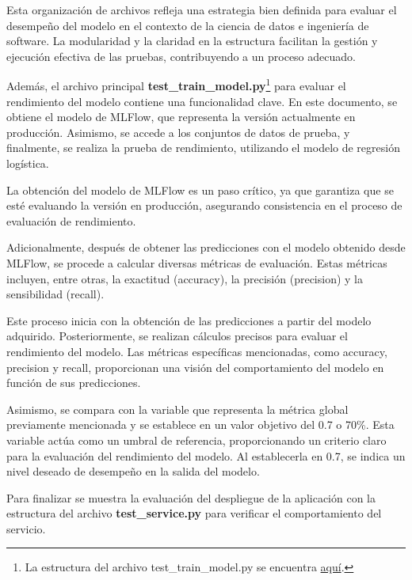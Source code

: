\newpage

Esta organización de archivos refleja una estrategia bien definida para evaluar el desempeño del modelo en el contexto de la ciencia de datos e ingeniería de software. La modularidad y la claridad en la estructura facilitan la gestión y ejecución efectiva de las pruebas, contribuyendo a un proceso adecuado.

Además, el archivo principal \textbf{test\_train\_model.py}\footnote{La estructura del archivo test\_train\_model.py se encuentra \href{https://github.com/juferoto/mlops_project/blob/master/training/tests/test_train_model.py}{aquí}.} para evaluar el rendimiento del modelo contiene una funcionalidad clave. En este documento, se obtiene el modelo de MLFlow, que representa la versión actualmente en producción. Asimismo, se accede a los conjuntos de datos de prueba, y finalmente, se realiza la prueba de rendimiento, utilizando el modelo de regresión logística.

La obtención del modelo de MLFlow es un paso crítico, ya que garantiza que se esté evaluando la versión en producción, asegurando consistencia en el proceso de evaluación de rendimiento.

Adicionalmente, después de obtener las predicciones con el modelo obtenido desde MLFlow, se procede a calcular diversas métricas de evaluación. Estas métricas incluyen, entre otras, la exactitud (accuracy), la precisión (precision) y la sensibilidad (recall).

Este proceso inicia con la obtención de las predicciones a partir del modelo adquirido. Posteriormente, se realizan cálculos precisos para evaluar el rendimiento del modelo. Las métricas específicas mencionadas, como accuracy, precision y recall, proporcionan una visión del comportamiento del modelo en función de sus predicciones.

Asimismo, se compara con la variable que representa la métrica global previamente mencionada y se establece en un valor objetivo del 0.7 o 70\%. Esta variable actúa como un umbral de referencia, proporcionando un criterio claro para la evaluación del rendimiento del modelo. Al establecerla en 0.7, se indica un nivel deseado de desempeño en la salida del modelo.

\newpage

Para finalizar se muestra la evaluación del despliegue de la aplicación con la estructura del archivo \textbf{test\_service.py} para verificar el comportamiento del servicio.

